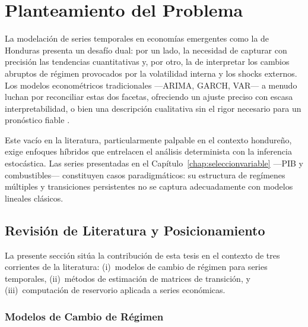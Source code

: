 \chapter{Planteamiento del Problema}
\label{chap:planteamiento}

La modelación de series temporales en economías emergentes como la de
Honduras presenta un desafío dual: por un lado, la necesidad de
capturar con precisión las tendencias cuantitativas y, por otro, la
de interpretar los cambios abruptos de régimen provocados por la
volatilidad interna y los shocks externos.  Los modelos
econométricos tradicionales ---ARIMA, GARCH, VAR--- a menudo luchan
por reconciliar estas dos facetas, ofreciendo un ajuste preciso con
escasa interpretabilidad, o bien una descripción cualitativa sin el
rigor necesario para un pronóstico fiable \cite{Hamilton1994,
Box2015, Tsay2010, Lutkepohl2005}.

Este vacío en la literatura, particularmente palpable en el contexto
hondureño, exige enfoques híbridos que entrelacen el análisis
determinista con la inferencia estocástica.  Las series presentadas
en el Capítulo~\ref{chap:seleccionvariable} ---PIB y
combustibles--- constituyen casos paradigmáticos: su estructura de
regímenes múltiples y transiciones persistentes no se captura
adecuadamente con modelos lineales clásicos.

\section{Revisión de Literatura y Posicionamiento}
\label{sec:revision_literatura}

La presente sección sitúa la contribución de esta tesis en el
contexto de tres corrientes de la literatura: (i)~modelos de cambio
de régimen para series temporales, (ii)~métodos de estimación de
matrices de transición, y (iii)~computación de reservorio aplicada
a series económicas.

\subsection{Modelos de Cambio de Régimen}

